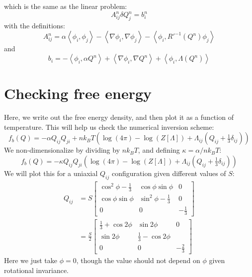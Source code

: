 \documentclass[reqno]{article}
\begin{document}
	which is the same as the linear problem:
	\begin{equation}
		A^n_{ij} \delta Q^n_j = b^n_i
	\end{equation}
	with the definitions:
	\begin{equation}
		A^n_{ij} = 
		\alpha \left< \phi_i, \phi_j \right>
		- \left< \nabla \phi_i, \nabla \phi_j \right>
		- \left< \phi_i, R'^{-1}(Q^n) \phi_j \right>
	\end{equation}
	and
	\begin{equation}
		b_i =
		- \left< \phi_i, \alpha Q^n \right>
		+ \left< \nabla \phi_i, \nabla Q^n \right>
		+ \left< \phi_i, \Lambda(Q^n) \right>
	\end{equation}

	\section{Checking free energy}
	Here, we write out the free energy density, and then plot it as a function of temperature.
	This will help us check the numerical inversion scheme:
	\begin{equation}
		f_b(Q)
		= -\alpha Q_{ij} Q_{ji}
		+ n k_B T \left(
			\log(4 \pi)
			- \log(Z[\Lambda])
			+ \Lambda_{ij}(Q_{ij} + \tfrac13 \delta_{ij})
		\right)
	\end{equation}
	We non-dimensionalize by dividing by $n k_B T$, and defining $\kappa = \alpha / n k_B T$:
	\begin{equation}
		f_b(Q)
		= -\kappa Q_{ij} Q_{ji}
		\left(
			\log(4 \pi)
			- \log(Z[\Lambda])
			+ \Lambda_{ij}(Q_{ij} + \tfrac13 \delta_{ij})
		\right)
	\end{equation}
	We will plot this for a uniaxial $Q_{ij}$ configuration given different values of $S$:
	\begin{equation}
	\begin{split}
		Q_{ij}
		&=
		S
		\begin{bmatrix}
			\cos^2 \phi - \tfrac13 &\cos\phi \sin\phi &0 \\
			\cos\phi \sin\phi &\sin^2\phi - \tfrac13 &0 \\
			0 &0 &-\tfrac13
		\end{bmatrix} \\
		&=
		\frac{S}{2}
		\begin{bmatrix}
			\tfrac13 + \cos2\phi &\sin2\phi &0 \\
			\sin2\phi &\tfrac13 - \cos2\phi \\
			0 &0 &-\tfrac23
		\end{bmatrix}
	\end{split}
	\end{equation}
	Here we just take $\phi = 0$, though the value should not depend on $\phi$
  given rotational invariance.
\end{document}
